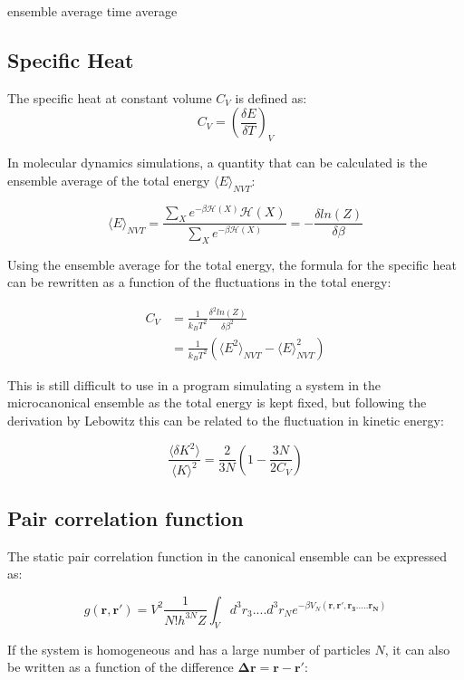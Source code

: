 \documentclass[
10pt, %
a4paper, %
oneside, %
headinclude,footinclude, %
BCOR5mm, %
]{scrartcl}
\begin{document}
ensemble average 
time average

\subsection{Specific Heat}

The specific heat at constant volume $C_V$  is defined as:
$$ C_V = \left ( \frac{\delta E}{\delta T} \right )_V $$

\noindent
In molecular dynamics simulations, a quantity that can be calculated is the ensemble average of the total energy $\langle E\rangle_{NVT}$:

$$ \langle E\rangle_{NVT} = \frac{ \sum_X e^{-\beta \mathcal{H}(X)} \mathcal{H}(X)}{ \sum_X e^{-\beta \mathcal{H}(X)}} = - \frac{\delta ln(Z)}{\delta \beta} $$

\noindent
Using the ensemble average for the total energy, the formula for the specific heat can be rewritten as a function of the fluctuations in the total energy:

\begin{align}
C_V &= \frac{1}{k_B T^2} \frac{\delta^2 ln(Z)}{\delta \beta^2} \\
&= \frac{1}{k_B T^2} \left ( \langle E^2\rangle_{NVT} - \langle E\rangle^2_{NVT} \right )
\end{align}

\noindent
This is still difficult to use in a program simulating a system in the microcanonical ensemble as the total energy is kept fixed, but following the derivation by Lebowitz\cite{Duane:1985lz} this can be related to the fluctuation in kinetic energy:

$$ \frac{\langle\delta K^2\rangle}{\langle K\rangle^2} = \frac{2}{3N} \left ( 1 - \frac{3N}{2C_V} \right ) $$



\subsection{Pair correlation function}

The static pair correlation function in the canonical ensemble can be expressed as:

$$ g(\mathbf{r,r'}) = V^2 \frac{1}{N!h^{3N}Z} \int_V d^3r_3....d^3r_N e^{-\beta V_N(\mathbf{r,r',r_3.....r_N})} $$

\noindent
If the system is homogeneous and has a large number of particles $N$, it can also be written as a function of the difference $\mathbf{\Delta r} = \mathbf{r} - \mathbf{r'}$:
\end{document}
